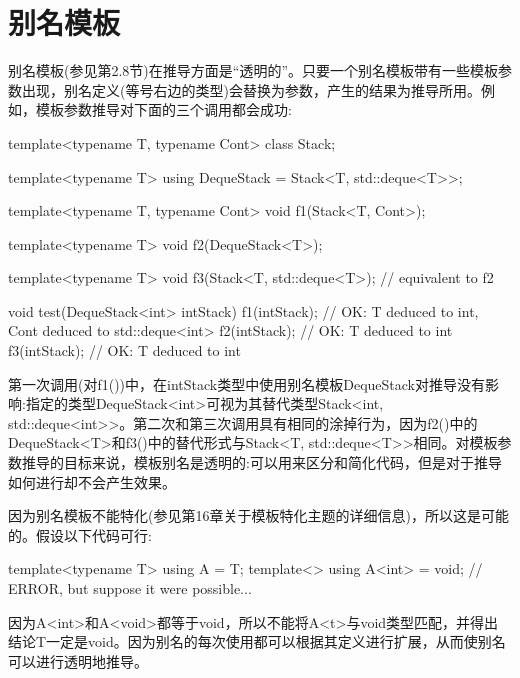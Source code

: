 \section{别名模板}
别名模板(参见第2.8节)在推导方面是“透明的”。只要一个别名模板带有一些模板参数出现，别名定义(等号右边的类型)会替换为参数，产生的结果为推导所用。例如，模板参数推导对下面的三个调用都会成功:

\begin{cpp}
template<typename T, typename Cont>
class Stack;

template<typename T>
using DequeStack = Stack<T, std::deque<T>>;

template<typename T, typename Cont>
void f1(Stack<T, Cont>);

template<typename T>
void f2(DequeStack<T>);

template<typename T>
void f3(Stack<T, std::deque<T>); // equivalent to f2

void test(DequeStack<int> intStack)
{
	f1(intStack); // OK: T deduced to int, Cont deduced to std::deque<int>
	f2(intStack); // OK: T deduced to int
	f3(intStack); // OK: T deduced to int
}
\end{cpp}

第一次调用(对f1())中，在intStack类型中使用别名模板DequeStack对推导没有影响:指定的类型DequeStack<int>可视为其替代类型Stack<int, std::deque<int>{}>。第二次和第三次调用具有相同的涂掉行为，因为f2()中的DequeStack<T>和f3()中的替代形式与Stack<T, std::deque<T>{}>相同。对模板参数推导的目标来说，模板别名是透明的:可以用来区分和简化代码，但是对于推导如何进行却不会产生效果。

因为别名模板不能特化(参见第16章关于模板特化主题的详细信息)，所以这是可能的。假设以下代码可行:

\begin{cpp}
template<typename T> using A = T;
template<> using A<int> = void; // ERROR, but suppose it were possible...
\end{cpp}

因为A<int>和A<void>都等于void，所以不能将A<t>与void类型匹配，并得出结论T一定是void。因为别名的每次使用都可以根据其定义进行扩展，从而使别名可以进行透明地推导。

























